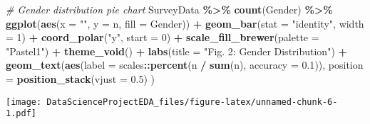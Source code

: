 \documentclass[
]{article}
\newenvironment{Shaded}{\begin{snugshade}}{\end{snugshade}}
\newcommand{\AttributeTok}[1]{\textcolor[rgb]{0.13,0.29,0.53}{#1}}
\newcommand{\CommentTok}[1]{\textcolor[rgb]{0.56,0.35,0.01}{\textit{#1}}}
\newcommand{\ConstantTok}[1]{\textcolor[rgb]{0.56,0.35,0.01}{#1}}
\newcommand{\DecValTok}[1]{\textcolor[rgb]{0.00,0.00,0.81}{#1}}
\newcommand{\FloatTok}[1]{\textcolor[rgb]{0.00,0.00,0.81}{#1}}
\newcommand{\FunctionTok}[1]{\textcolor[rgb]{0.13,0.29,0.53}{\textbf{#1}}}
\newcommand{\NormalTok}[1]{#1}
\newcommand{\OtherTok}[1]{\textcolor[rgb]{0.56,0.35,0.01}{#1}}
\newcommand{\SpecialCharTok}[1]{\textcolor[rgb]{0.81,0.36,0.00}{\textbf{#1}}}
\newcommand{\StringTok}[1]{\textcolor[rgb]{0.31,0.60,0.02}{#1}}
\begin{document}
\begin{Shaded}
\begin{Highlighting}[]
\CommentTok{\# Gender distribution pie chart}
\NormalTok{SurveyData }\SpecialCharTok{\%\textgreater{}\%}
  \FunctionTok{count}\NormalTok{(Gender) }\SpecialCharTok{\%\textgreater{}\%}
  \FunctionTok{ggplot}\NormalTok{(}\FunctionTok{aes}\NormalTok{(}\AttributeTok{x =} \StringTok{""}\NormalTok{, }\AttributeTok{y =}\NormalTok{ n, }\AttributeTok{fill =}\NormalTok{ Gender)) }\SpecialCharTok{+}
  \FunctionTok{geom\_bar}\NormalTok{(}\AttributeTok{stat =} \StringTok{"identity"}\NormalTok{, }\AttributeTok{width =} \DecValTok{1}\NormalTok{) }\SpecialCharTok{+}
  \FunctionTok{coord\_polar}\NormalTok{(}\StringTok{"y"}\NormalTok{, }\AttributeTok{start =} \DecValTok{0}\NormalTok{) }\SpecialCharTok{+}
  \FunctionTok{scale\_fill\_brewer}\NormalTok{(}\AttributeTok{palette =} \StringTok{"Pastel1"}\NormalTok{) }\SpecialCharTok{+}
  \FunctionTok{theme\_void}\NormalTok{() }\SpecialCharTok{+}
  \FunctionTok{labs}\NormalTok{(}\AttributeTok{title =} \StringTok{"Fig. 2: Gender Distribution"}\NormalTok{) }\SpecialCharTok{+}
  \FunctionTok{geom\_text}\NormalTok{(}\FunctionTok{aes}\NormalTok{(}\AttributeTok{label =}\NormalTok{ scales}\SpecialCharTok{::}\FunctionTok{percent}\NormalTok{(n }\SpecialCharTok{/} \FunctionTok{sum}\NormalTok{(n), }\AttributeTok{accuracy =} \FloatTok{0.1}\NormalTok{)),}
    \AttributeTok{position =} \FunctionTok{position\_stack}\NormalTok{(}\AttributeTok{vjust =} \FloatTok{0.5}\NormalTok{)}
\NormalTok{  )}
\end{Highlighting}
\end{Shaded}

\texttt{[image: DataScienceProjectEDA\_files/figure-latex/unnamed-chunk-6-1.pdf]}

\begin{Shaded}
\end{Shaded}
\end{document}
